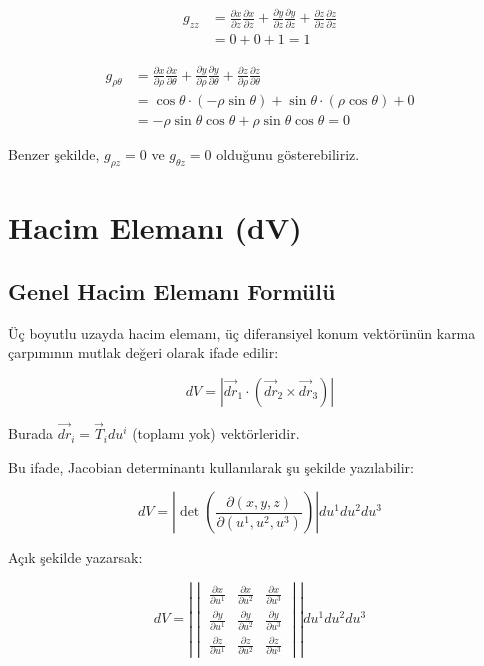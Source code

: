 \documentclass[11pt,letterpaper,twocolumn]{fenbil}
\begin{document}
\begin{enumerate}
   \begin{align}
   g_{zz} &= \frac{\partial x}{\partial z}\frac{\partial x}{\partial z} + \frac{\partial y}{\partial z}\frac{\partial y}{\partial z} + \frac{\partial z}{\partial z}\frac{\partial z}{\partial z}\\
   &= 0 + 0 + 1 = 1
   \end{align}
   
   \begin{align}
   g_{\rho\theta} &= \frac{\partial x}{\partial \rho}\frac{\partial x}{\partial \theta} + \frac{\partial y}{\partial \rho}\frac{\partial y}{\partial \theta} + \frac{\partial z}{\partial \rho}\frac{\partial z}{\partial \theta}\\
   &= \cos \theta \cdot (-\rho \sin \theta) + \sin \theta \cdot (\rho \cos \theta) + 0\\
   &= -\rho \sin \theta \cos \theta + \rho \sin \theta \cos \theta = 0
   \end{align}
\end{enumerate}

Benzer şekilde, $g_{\rho z} = 0$ ve $g_{\theta z} = 0$ olduğunu gösterebiliriz.

\section{Hacim Elemanı (dV)}

\subsection{Genel Hacim Elemanı Formülü}

Üç boyutlu uzayda hacim elemanı, üç diferansiyel konum vektörünün karma çarpımının mutlak değeri olarak ifade edilir:

\begin{equation}
dV = |\vec{dr}_1 \cdot (\vec{dr}_2 \times \vec{dr}_3)|
\end{equation}

Burada $\vec{dr}_i = \vec{T}_i du^i$ (toplamı yok) vektörleridir.

Bu ifade, Jacobian determinantı kullanılarak şu şekilde yazılabilir:

\begin{equation}
dV = \left|\det\left(\frac{\partial(x,y,z)}{\partial(u^1,u^2,u^3)}\right)\right| du^1 du^2 du^3
\end{equation}

Açık şekilde yazarsak:

\begin{equation}
dV = \left|\begin{vmatrix} 
\frac{\partial x}{\partial u^1} & \frac{\partial x}{\partial u^2} & \frac{\partial x}{\partial u^3} \\
\frac{\partial y}{\partial u^1} & \frac{\partial y}{\partial u^2} & \frac{\partial y}{\partial u^3} \\
\frac{\partial z}{\partial u^1} & \frac{\partial z}{\partial u^2} & \frac{\partial z}{\partial u^3}
\end{vmatrix}\right| du^1 du^2 du^3
\end{equation}
\end{document}

